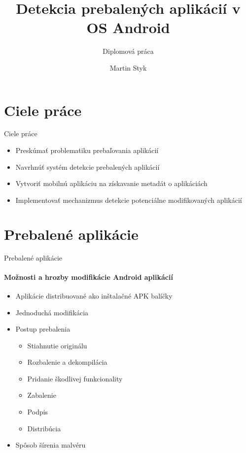 \documentclass{beamer}
\title{Detekcia prebalených aplikácií v OS Android} %
\subtitle{Diplomová práca} %
\author{Martin Styk}
\begin{document}
  \frame{\maketitle}

\section{Ciele práce}
  \begin{frame}[label=lists]{Ciele práce}
    \begin{itemize}
    \item Preskúmať problematiku prebaľovania aplikácií
    \item Navrhnúť systém detekcie prebalených aplikácií
	\item Vytvoriť mobilnú aplikáciu na získavanie metadát o aplikáciách
	\item Implementovať mechanizmus detekcie potenciálne modifikovaných aplikácií
    \end{itemize}  
  \end{frame}
  
  \section{Prebalené aplikácie}
  \begin{frame}[label=lists]{Prebalené aplikácie}
 	 \framesubtitle{Možnosti a hrozby modifikácie Android aplikácií}
	\begin{itemize}
		\item Aplikácie distribuované ako inštalačné APK balíčky
	 	\item Jednoduchá modifikácia
		\item Postup prebalenia
			\begin{itemize}
				\item Stiahnutie originálu
				\item Rozbalenie a dekompilácia
				\item Pridanie škodlivej funkcionality
				\item Zabalenie
				\item Podpis
				\item Distribúcia
			\end{itemize}
  		\item Spôsob šírenia malvéru
	\end{itemize}
  \end{frame} 
  
\end{document}
